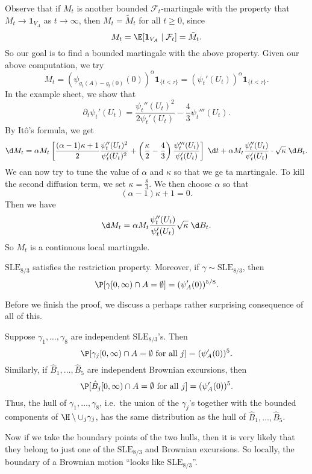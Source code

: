 \documentclass[a4paper]{article}
\newcommand\SLE{\mathrm{SLE}}
\begin{document}
Observe that if $M_t$ is another bounded $\mathcal{F}_t$-martingale with the property that $M_t \to \mathbf{1}_{V_A}$ as $t \to \infty$, then $M_t = \tilde{M}_t$ for all $t \geq 0$, since
\[
  M_t = \E[\mathbf{1}_{V_A} \mid \mathcal{F}_t] = \tilde{M}_t.
\]
So our goal is to find a bounded martingale with the above property. Given our above computation, we try
\[
  M_t = (\psi_{g_t(A) - g_t(0)}(0))^\alpha \mathbf{1}_{\{t < \tau\}} = (\psi_t'(U_t))^\alpha \mathbf{1}_{\{t < \tau\}}.
\]
In the example sheet, we show that
\[
  \partial_t \psi_t' (U_t) = \frac{\psi_t''(U_t)^2}{2\psi_t'(U_t)} - \frac{4}{3} \psi_t'''(U_t).
\]
By It\^o's formula, we get
\[
  \d M_t = \alpha M_t \left[\frac{(\alpha - 1)\kappa + 1}{2} \frac{\psi_t''(U_t)^2}{\psi_t'(U_t)^2} + \left(\frac{\kappa}{2} - \frac{4}{3}\right) \frac{\psi_t'''(U_t)}{\psi_t'(U_t)}\right]\;\d t + \alpha M_t \frac{\psi_t''(U_t)}{\psi_t'(U_t)} \cdot \sqrt{\kappa} \;\d B_t.
\]
We can now try to tune the value of $\alpha$ and $\kappa$ so that we ge ta martingale. To kill the second diffusion term, we set $\kappa = \frac{8}{3}$. We then choose $\alpha$ so that
\[
  (\alpha - 1) \kappa + 1 = 0.
\]
Then we have
\[
  \d M_t = \alpha M_t \frac{\psi_t''(U_t)}{\psi_t'(U_t)}\sqrt{\kappa} \;\d B_t.
\]
So $M_t$ is a continuous local martingale.
\begin{thm}
  $\SLE_{8/3}$ satisfies the restriction property. Moreover, if $\gamma \sim \SLE_{8/3}$, then
  \[
    \P[\gamma[0, \infty) \cap A = \emptyset] = (\psi_A'(0))^{5/8}.
  \]
\end{thm}
Before we finish the proof, we discuss a perhaps rather surprising consequence of all of this.

Suppose $\gamma_1, \ldots, \gamma_8$ are independent $\SLE_{8/3}$'s. Then
\[
  \P[\gamma_j[0, \infty) \cap A = \emptyset\text{ for all }j] = (\psi_A'(0))^5.
\]
Similarly, if $\hat{B}_1, \ldots, \hat{B}_5$ are independent Brownian excursions, then
\[
  \P[\hat{B}_j[0, \infty) \cap A = \emptyset\text{ for all }j] = (\psi_A'(0))^5.
\]
Thus, the hull of $\gamma_1, \ldots, \gamma_8$, i.e.\ the union of the $\gamma_j$'s together with the bounded components of $\H \setminus \cup_j \gamma_j$, has the same distribution as the hull of $\hat{B}_1, \ldots, \hat{B}_5$.

Now if we take the boundary points of the two hulls, then it is very likely that they belong to just one of the $\SLE_{8/3}$ and Brownian excursions. So locally, the boundary of a Brownian motion ``looks like $\SLE_{8/3}$''.


\printindex
\end{document}
